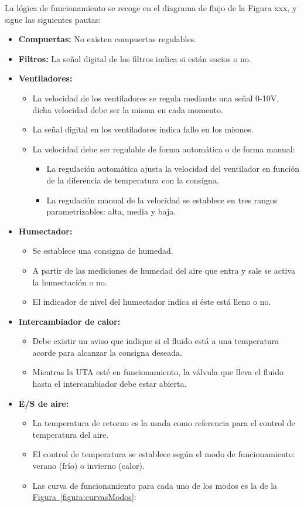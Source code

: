 La lógica de funcionamiento se recoge en el diagrama de flujo de la Figura xxx, y sigue las siguientes pautas:

\begin{itemize}
  \item \textbf{Compuertas:} No existen compuertas regulables.
  \item \textbf{Filtros:} La señal digital de los filtros indica si están sucios o no.
  \item \textbf{Ventiladores:} 
  \begin{itemize}
    \item La velocidad de los ventiladores se regula mediante una señal 0-10V, dicha velocidad debe ser la misma en cada momento.
    \item La señal digital en los ventiladores indica fallo en los mismos.
    \item La velocidad debe ser regulable de forma automática o de forma manual:
    \begin{itemize}
      \item La regulación automática ajusta la velocidad del ventilador en función de la diferencia de temperatura con la consigna.
      \item La regulación manual de la velocidad se establece en tres rangos parametrizables: alta, media y baja.
    \end{itemize}
  \end{itemize} 
  \item \textbf{Humectador:} 
  \begin{itemize}
    \item Se establece una consigna de humedad.
    \item A partir de las mediciones de humedad del aire que entra y sale se activa la humectación o no.
    \item El indicador de nivel del humectador indica si éste está lleno o no.
  \end{itemize}
  \item \textbf{Intercambiador de calor:}
  \begin{itemize}
    \item Debe existir un aviso que indique si el fluido está a una temperatura acorde para alcanzar la consigna deseada.
    \item Mientras la UTA esté en funcionamiento, la válvula que lleva el fluido hasta el intercambiador debe estar abierta.
  \end{itemize}
  \item \textbf{E/S de aire:}
  \begin{itemize}
    \item La temperatura de retorno es la usada como referencia para el control de temperatura del aire.
    \item El control de temperatura se establece según el modo de funcionamiento: verano (frío) o invierno (calor).
    \item Las curva de funcionamiento para cada uno de los modos es la de la \hyperref[figura:curvasModos]{Figura~\ref{figura:curvasModos}}:
  \end{itemize}
\end{itemize}

